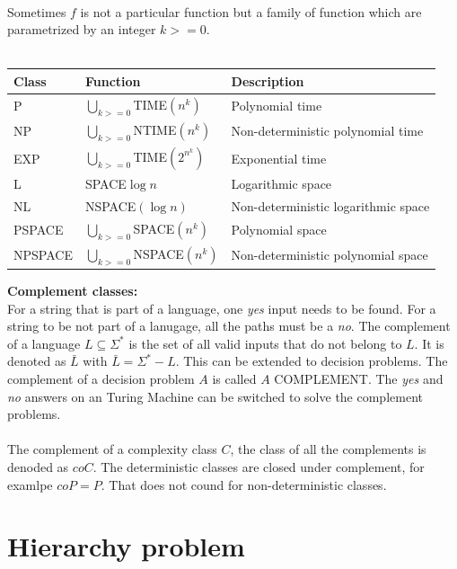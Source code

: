 \documentclass[a4]{scrartcl}
\begin{document}
\ \\
Sometimes $f$ is not a particular function but a family of function which are parametrized by an integer $k>=0$. 
\ \\ \\
\begin{tabular}{lll}
Class & Function & Description \\
\hline
P & $\bigcup_{k >= 0} $TIME$(n^k)$ & Polynomial time \\
NP&$\bigcup_{k >= 0} $NTIME$(n^k)$ & Non-deterministic polynomial time \\
  EXP & $\bigcup_{k >= 0} $TIME$(2^{n^k})$ & Exponential time \\
   \hline
   L & SPACE$\log n$ & Logarithmic space \\
    NL &  NSPACE$(\log n)$ & Non-deterministic logarithmic space \\
     PSPACE & $\bigcup_{k >= 0} $SPACE$(n^k)$ & Polynomial space \\
      NPSPACE & $\bigcup_{k >= 0} $NSPACE$(n^k)$ & Non-deterministic polynomial space\\
      \hline
\end{tabular}


\newpage
\textbf{Complement classes:} \cite{book, CC} \\

For a string that is part of a language, one \textit{yes} input needs to be found. For a string to be not part of a lanugage, all the paths must be a \textit{no}.
The complement of a language $L \subseteq \Sigma^*$ is the set of all valid inputs that do not belong to $L$. It is denoted as $\bar{L}$ with $\bar{L} = \Sigma^* - L$.
This can be extended to decision problems. The complement of a decision problem $A$ is called $A$ COMPLEMENT.
The \textit{yes} and \textit{no} answers on an Turing Machine can be switched to solve the complement problems.
\ \\
\\
The complement of a complexity class $C$, the class of all the complements is denoded as $coC$. The deterministic classes are closed under complement, for examlpe $coP = P$. That does not cound for non-deterministic classes.





\section*{Hierarchy problem} 
\end{document}
